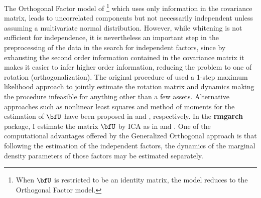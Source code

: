 The Orthogonal Factor model of \cite{Alexander2001}\footnote{When $\bfU$
is restricted to be an identity matrix, the model reduces to the Orthogonal
Factor model.} which uses only information in the covariance matrix, leads to
uncorrelated components but not necessarily independent unless assuming a
multivariate normal distribution. However, while whitening is not sufficient
for independence, it is nevertheless an important step in the preprocessing of
the data in the search for independent factors, since by exhausting the second
order information contained in the covariance matrix it makes it easier to infer
higher order information, reducing the problem to one of rotation (orthogonalization).
The original procedure of \cite{Weide2002} used a 1-step maximum likelihood
approach to jointly estimate the rotation matrix and dynamics making the procedure
infeasible for anything other than a few assets. Alternative approaches such as
nonlinear least squares and method of moments for the estimation of $\bfU$ have
been proposed in \cite{Weide2004} and \cite{Weide2008}, respectively.
In the {\bf rmgarch} package, I estimate the matrix \( \bfU \) by ICA as in
\cite{Broda2009} and \cite{Zhang2009}. One of the computational
advantages offered by the Generalized Orthogonal approach is that following the
estimation of the independent factors, the dynamics of the marginal density
parameters of those factors may be estimated separately.
